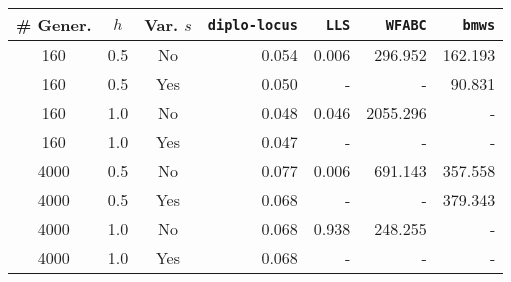 \begin{tabular}{cccrrrr}
\toprule
\# Gener. & $h$ & Var. $s$ & \texttt{diplo-locus} & \texttt{LLS} & \texttt{WFABC} & \texttt{bmws} \\
\midrule
160 & 0.5 & No & 0.054 & 0.006 & 296.952 & 162.193 \\
160 & 0.5 & Yes & 0.050 & - & - & 90.831 \\
160 & 1.0 & No & 0.048 & 0.046 & 2055.296 & - \\
160 & 1.0 & Yes & 0.047 & - & - & - \\
4000 & 0.5 & No & 0.077 & 0.006 & 691.143 & 357.558 \\
4000 & 0.5 & Yes & 0.068 & - & - & 379.343 \\
4000 & 1.0 & No & 0.068 & 0.938 & 248.255 & - \\
4000 & 1.0 & Yes & 0.068 & - & - & - \\
\bottomrule
\end{tabular}
